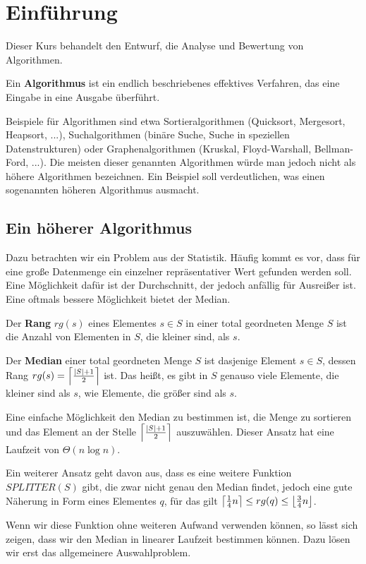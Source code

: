 %
%
%
\section{Einführung}

Dieser Kurs behandelt den Entwurf, die Analyse und Bewertung von Algorithmen.

Ein \textbf{Algorithmus} ist ein endlich beschriebenes effektives Verfahren,
das eine Eingabe in eine Ausgabe überführt.

Beispiele für Algorithmen sind etwa
Sortieralgorithmen (Quicksort, Mergesort, Heapsort, ...),
Suchalgorithmen (binäre Suche, Suche in speziellen Datenstrukturen) oder
Graphenalgorithmen (Kruskal, Floyd-Warshall, Bellman-Ford, ...).
Die meisten dieser genannten Algorithmen würde man jedoch nicht als höhere Algorithmen bezeichnen.
Ein Beispiel soll verdeutlichen, was einen sogenannten höheren Algorithmus ausmacht.

\subsection{Ein höherer Algorithmus}

Dazu betrachten wir ein Problem aus der Statistik.
Häufig kommt es vor, dass für eine große Datenmenge ein einzelner repräsentativer Wert gefunden werden soll.
Eine Möglichkeit dafür ist der Durchschnitt, der jedoch anfällig für Ausreißer ist.
Eine oftmals bessere Möglichkeit bietet der Median.

Der \textbf{Rang} $rg(s)$ eines Elementes $s \in S$
in einer total geordneten Menge $S$ ist die Anzahl von Elementen in $S$,
die kleiner sind, als $s$.

Der \textbf{Median} einer total geordneten Menge $S$ ist dasjenige Element $s \in S$,
dessen Rang $rg(s) = \left\lceil{\frac{\left|S\right|+1}{2}}\right\rceil$ ist.
Das heißt, es gibt in $S$ genauso viele Elemente, die kleiner sind als $s$,
wie Elemente, die größer sind als $s$.

Eine einfache Möglichkeit den Median zu bestimmen ist,
die Menge zu sortieren und das Element an der Stelle $\left\lceil{\frac{\left|S\right|+1}{2}}\right\rceil$ auszuwählen.
Dieser Ansatz hat eine Laufzeit von $\Theta(n \log n)$.

Ein weiterer Ansatz geht davon aus, dass es eine weitere Funktion $SPLITTER(S)$ gibt,
die zwar nicht genau den Median findet, jedoch eine gute Näherung in Form eines Elementes $q$,
für das gilt $\left\lceil{\frac{1}{4} n}\right\rceil \leq rg(q) \leq \left\lfloor{\frac{3}{4} n}\right\rfloor$.

Wenn wir diese Funktion ohne weiteren Aufwand verwenden können, so lässt sich zeigen,
dass wir den Median in linearer Laufzeit bestimmen können.
Dazu lösen wir erst das allgemeinere Auswahlproblem.

